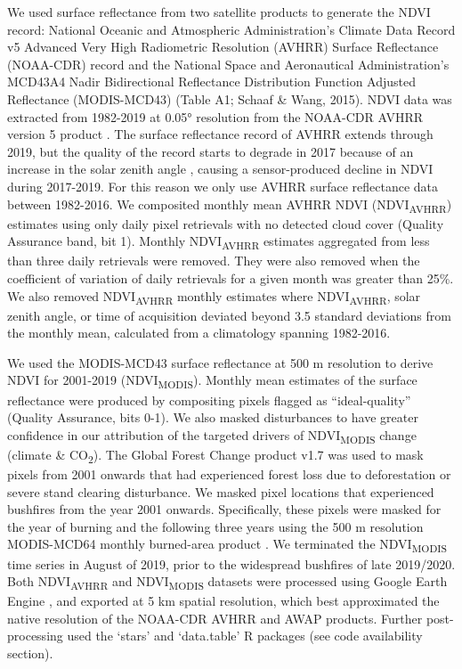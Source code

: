\documentclass[gc, manuscript]{copernicus}
\begin{document}
We used surface reflectance from two satellite products to generate the
NDVI record: National Oceanic and Atmospheric Administration's Climate
Data Record v5 Advanced Very High Radiometric Resolution (AVHRR) Surface
Reflectance (NOAA-CDR) record and the National Space and Aeronautical
Administration's MCD43A4 Nadir Bidirectional Reflectance Distribution
Function Adjusted Reflectance (MODIS-MCD43) (Table A1; Schaaf \& Wang,
2015). NDVI data was extracted from 1982-2019 at 0.05° resolution from
the NOAA-CDR AVHRR version 5 product \citep{vermoteNOAAClimateData2018}.
The surface reflectance record of AVHRR extends through 2019, but the
quality of the record starts to degrade in 2017 because of an increase
in the solar zenith angle \citep{jiEffectNOAASatellite2017a}, causing a
sensor-produced decline in NDVI during 2017-2019. For this reason we
only use AVHRR surface reflectance data between 1982-2016. We composited
monthly mean AVHRR NDVI (NDVI\textsubscript{AVHRR}) estimates using only
daily pixel retrievals with no detected cloud cover (Quality Assurance
band, bit 1). Monthly NDVI\textsubscript{AVHRR} estimates aggregated
from less than three daily retrievals were removed. They were also
removed when the coefficient of variation of daily retrievals for a
given month was greater than 25\%. We also removed
NDVI\textsubscript{AVHRR} monthly estimates where
NDVI\textsubscript{AVHRR}, solar zenith angle, or time of acquisition
deviated beyond 3.5 standard deviations from the monthly mean,
calculated from a climatology spanning 1982-2016.

We used the MODIS-MCD43 surface reflectance at 500 m resolution to
derive NDVI for 2001-2019 (NDVI\textsubscript{MODIS}). Monthly mean
estimates of the surface reflectance were produced by compositing pixels
flagged as ``ideal-quality'' (Quality Assurance, bits 0-1). We also
masked disturbances to have greater confidence in our attribution of the
targeted drivers of NDVI\textsubscript{MODIS} change (climate \&
CO\textsubscript{2}). The Global Forest Change product v1.7
\citep{hansenHighResolutionGlobalMaps2013e} was used to mask pixels from
2001 onwards that had experienced forest loss due to deforestation or
severe stand clearing disturbance. We masked pixel locations that
experienced bushfires from the year 2001 onwards. Specifically, these
pixels were masked for the year of burning and the following three years
using the 500 m resolution MODIS-MCD64 monthly burned-area product
\citep{giglioCollectionMODISBurned2018b}. We terminated the
NDVI\textsubscript{MODIS} time series in August of 2019, prior to the
widespread bushfires of late 2019/2020. Both NDVI\textsubscript{AVHRR}
and NDVI\textsubscript{MODIS} datasets were processed using Google Earth
Engine \citep{gorelickGoogleEarthEngine2017}, and exported at 5 km
spatial resolution, which best approximated the native resolution of the
NOAA-CDR AVHRR and AWAP products. Further post-processing used the
`stars' \citep{pebesmaStarsSpatiotemporalArrays2020} and `data.table'
\citep{dowleDataTableExtension2019} R packages (see code availability
section).
\end{document}
